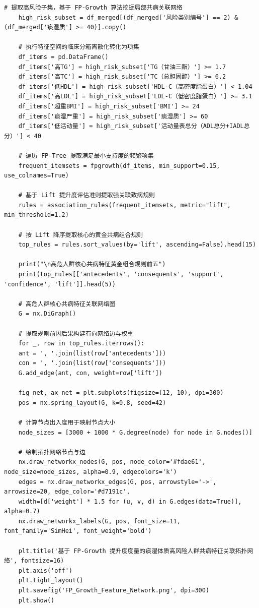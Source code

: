 \documentclass[12pt]{article}
\begin{document}
\begin{lstlisting}[caption={CART代理决策树+FP-Growth关联规则挖掘}, label={code:cart_fpgrowth}]
	# 提取高风险子集，基于 FP-Growth 算法挖掘局部共病关联网络
	high_risk_subset = df_merged[(df_merged['风险类别编号'] == 2) & (df_merged['痰湿质'] >= 40)].copy()
	
	# 执行特征空间的临床分箱离散化转化为项集
	df_items = pd.DataFrame()
	df_items['高TG'] = high_risk_subset['TG（甘油三酯）'] >= 1.7
	df_items['高TC'] = high_risk_subset['TC（总胆固醇）'] >= 6.2
	df_items['低HDL'] = high_risk_subset['HDL-C（高密度脂蛋白）'] < 1.04
	df_items['高LDL'] = high_risk_subset['LDL-C（低密度脂蛋白）'] >= 3.1
	df_items['超重BMI'] = high_risk_subset['BMI'] >= 24
	df_items['痰湿严重'] = high_risk_subset['痰湿质'] >= 60
	df_items['低活动量'] = high_risk_subset['活动量表总分（ADL总分+IADL总分）'] < 40
	
	# 遍历 FP-Tree 提取满足最小支持度的频繁项集
	frequent_itemsets = fpgrowth(df_items, min_support=0.15, use_colnames=True)
	
	# 基于 Lift 提升度评估准则提取强关联致病规则
	rules = association_rules(frequent_itemsets, metric="lift", min_threshold=1.2)
	
	# 按 Lift 降序提取核心的黄金共病组合规则
	top_rules = rules.sort_values(by='lift', ascending=False).head(15)
	
	print("\n高危人群核心共病特征黄金组合规则前五")
	print(top_rules[['antecedents', 'consequents', 'support', 'confidence', 'lift']].head(5))
	
	# 高危人群核心共病特征关联网络图
	G = nx.DiGraph()
	
	# 提取规则前因后果构建有向网络边与权重
	for _, row in top_rules.iterrows():
	ant = ', '.join(list(row['antecedents']))
	con = ', '.join(list(row['consequents']))
	G.add_edge(ant, con, weight=row['lift'])
	
	fig_net, ax_net = plt.subplots(figsize=(12, 10), dpi=300)
	pos = nx.spring_layout(G, k=0.8, seed=42)
	
	# 计算节点出入度用于映射节点大小
	node_sizes = [3000 + 1000 * G.degree(node) for node in G.nodes()]
	
	# 绘制拓扑网络节点与边
	nx.draw_networkx_nodes(G, pos, node_color='#fdae61', node_size=node_sizes, alpha=0.9, edgecolors='k')
	edges = nx.draw_networkx_edges(G, pos, arrowstyle='->', arrowsize=20, edge_color='#d7191c',
	width=[d['weight'] * 1.5 for (u, v, d) in G.edges(data=True)], alpha=0.7)
	nx.draw_networkx_labels(G, pos, font_size=11, font_family='SimHei', font_weight='bold')
	
	plt.title('基于 FP-Growth 提升度度量的痰湿体质高风险人群共病特征关联拓扑网络', fontsize=16)
	plt.axis('off')
	plt.tight_layout()
	plt.savefig('FP_Growth_Feature_Network.png', dpi=300)
	plt.show()
\end{lstlisting}
\end{document}
